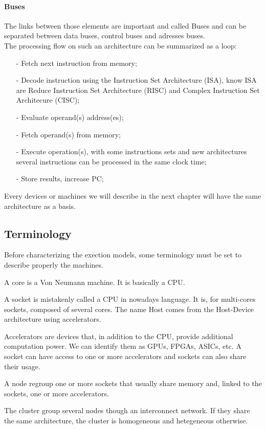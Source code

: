 \paragraph{Buses}
The links between those elements are important and called Buses and can be separated between data buses, control buses and adresses buses.\\

The processing flow on such an architecture can be summarized as a loop: 
\begin{itemize}[noitemsep,nolistsep]
\item[-] Fetch next instruction from memory;
\item[-] Decode instruction using the Instruction Set Architecture (ISA), know ISA are Reduce Instruction Set Architecture (RISC) and Complex Instruction Set Architecure (CISC);
\item[-] Evaluate operand(s) address(es);
\item[-] Fetch operand(s) from memory;
\item[-] Execute operation(s), with some instructions sets and new architectures several instructions can be processed in the same clock time;
\item[-] Store results, increase PC; 
\end{itemize}

Every devices or machines we will describe in the next chapter will have the same architecture as a basis. 

\subsection{Terminology}
Before characterizing the exection models, some terminology must be set to describe properly the machines. 

\begin{description}
	\item[Core:] A core is a Von Neumann machine. It is basically a CPU. 
	\item[Socket/Host:] A socket is mistakenly called a CPU in nowadays language. It is, for multi-cores sockets, composed of several cores. The name Host comes from the Host-Device architecture using accelerators. 
	\item[Accelerators/Devices:] Accelerators are devices that, in addition to the CPU, provide additional computation power. We can identify them as GPUs, FPGAs, ASICs, etc. A socket can have access to one or more accelerators and sockets can also share their usage. 
	\item[Node:] A node regroup one or more sockets that usually share memory and, linked to the sockets, one or more accelerators. 
	\item[Cluster/Supercomputer] The cluster group several nodes though an interconnect network. 
	If they share the same architecture, the cluster is homogeneous and hetegeneous otherwise. 
\end{description}

